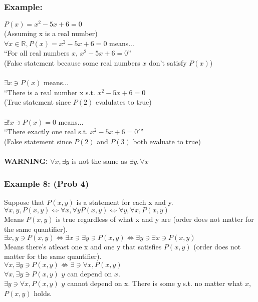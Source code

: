 \documentclass{article}
\begin{document}
\subsubsection{Example:}
$P(x) = x^2 - 5x + 6 = 0$\\
(Assuming x is a real number)\\
$\forall x \in \mathbb{R}, P(x) = x^2 - 5x + 6 = 0$ means...\\
``For all real numbers $x$, $x^2 - 5x + 6 = 0$''\\
(False statement because some real numbers $x$ don't satisfy $P(x)$)\\\\
$\exists x \ni P(x)$ means...\\
``There is a real number x s.t. $x^2 - 5x + 6 = 0$\\
(True statement since $P(2)$ evalulates to true)\\\\
$\exists ! x \ni P(x) = 0$ means...\\
``There exactly one real s.t. $x^2-5x+6=0'$''\\
(False statement since $P(2)$ and $P(3)$ both evaluate to true)\\\\
\textbf{WARNING:} $\forall x, \exists y$ is not the same as $\exists y, \forall x$
\subsubsection{Example 8: (Prob 4)}
Suppose that $P(x, y)$ is a statement for each x and y.\\
$\forall x, y, P(x, y) \iff \forall x, \forall y P(x, y) \iff \forall y, \forall x, P(x, y)$\\
Means $P(x, y)$ is true regardless of what x and y are (order does not matter for the same quantifier).\\
$\exists x,y \ni P(x,y) \iff \exists x \ni \exists y \ni P(x, y) \iff \exists y \ni \exists x \ni P(x, y)$\\
Means there's atleast one x and one y that satisfies $P(x, y)$ (order does not matter for the same quantifier).\\
$\forall x, \exists y \ni P(x,y) \not\iff \exists \ni \forall x, P(x,y)$\\
$\forall x, \exists y \ni P(x, y)$ $y$ can depend on $x$.\\
$\exists y \ni \forall x, P(x, y)$ $y$ cannot depend on x. There is some $y$ s.t. no matter what $x$, $P(x, y)$ holds.
\end{document}
